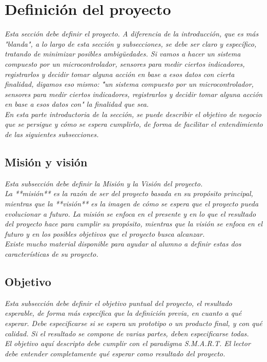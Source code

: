 \documentclass[12pt]{article}
\begin{document}
\section{Definición del proyecto}
{\it
Esta sección debe definir el proyecto. A diferencia de la introducción, que es más "blanda", a lo largo de esta sección y subsecciones, se debe ser claro y específico, tratando de minimizar posibles ambigüedades.
Si vamos a hacer un sistema compuesto por un microcontrolador, sensores para medir ciertos indicadores, registrarlos y decidir tomar alguna acción en base a esos datos con cierta finalidad, digamos eso mismo: {\u "un sistema compuesto por un microcontrolador, sensores para medir ciertos indicadores, registrarlos y decidir tomar alguna acción en base a esos datos con"} la finalidad que sea.\\

En esta parte introductoria de la sección, se puede describir el objetivo de negocio que se persigue y cómo se espera cumplirlo, de forma de facilitar el entendimiento de las siguientes subsecciones.
}

\subsection{Misión y visión}
{\it
Esta subsección debe definir la Misión y la Visión del proyecto.\\
La **misión** es la razón de ser del proyecto basada en su propósito principal, mientras que la **visión** es la imagen de cómo se espera que el proyecto pueda evolucionar a futuro. La misión se enfoca en el presente y en lo que el resultado del proyecto hace para cumplir su propósito, mientras que la visión se enfoca en el futuro y en los posibles objetivos que el proyecto busca alcanzar.\\
Existe mucho material disponible para ayudar al alumno a definir estas dos características de su proyecto.
}

\subsection{Objetivo}
{\it
Esta subsección debe definir el objetivo puntual del proyecto, el resultado esperable, de forma más específica que la definición previa, en cuanto a qué esperar. Debe especificarse si se espera un prototipo o un producto final, y con qué calidad. Si el resultado se compone de varias partes, deben especificarse todas.\\
El objetivo aquí descripto debe cumplir con el paradigma S.M.A.R.T. El lector debe entender completamente qué esperar como resultado del proyecto.
}
\end{document}
